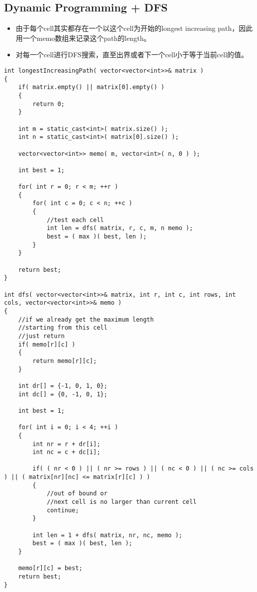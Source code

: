 \subsection{Dynamic Programming + DFS}
\begin{itemize}
\item 由于每个cell其实都存在一个以这个cell为开始的longest increasing path，因此用一个memo数组来记录这个path的length。
\item 对每一个cell进行DFS搜索，直至出界或者下一个cell小于等于当前cell的值。
\end{itemize}
\setcounter{lstlisting}{0}
\begin{lstlisting}[style=customc, caption={Dynamic Programming + DFS}]
int longestIncreasingPath( vector<vector<int>>& matrix )
{
    if( matrix.empty() || matrix[0].empty() )
    {
        return 0;
    }

    int m = static_cast<int>( matrix.size() );
    int n = static_cast<int>( matrix[0].size() );

    vector<vector<int>> memo( m, vector<int>( n, 0 ) );

    int best = 1;

    for( int r = 0; r < m; ++r )
    {
        for( int c = 0; c < n; ++c )
        {
            //test each cell
            int len = dfs( matrix, r, c, m, n memo );
            best = ( max )( best, len );
        }
    }

    return best;
}

int dfs( vector<vector<int>>& matrix, int r, int c, int rows, int cols, vector<vector<int>>& memo )
{
    //if we already get the maximum length
    //starting from this cell
    //just return
    if( memo[r][c] )
    {
        return memo[r][c];
    }

    int dr[] = {-1, 0, 1, 0};
    int dc[] = {0, -1, 0, 1};

    int best = 1;

    for( int i = 0; i < 4; ++i )
    {
        int nr = r + dr[i];
        int nc = c + dc[i];

        if( ( nr < 0 ) || ( nr >= rows ) || ( nc < 0 ) || ( nc >= cols ) || ( matrix[nr][nc] <= matrix[r][c] ) )
        {
            //out of bound or
            //next cell is no larger than current cell
            continue;
        }

        int len = 1 + dfs( matrix, nr, nc, memo );
        best = ( max )( best, len );
    }

    memo[r][c] = best;
    return best;
}
\end{lstlisting}


